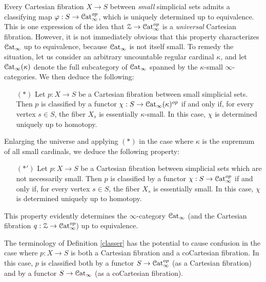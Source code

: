 \begin{remark}\label{uniright}
Every Cartesian fibration $X \rightarrow S$ between {\em small} simplicial sets admits a classifying map $\varphi: S \rightarrow \operatorname{\mathcal{C}at}_{\infty}^{op}$, which is uniquely determined up to equivalence. 
This is one expression of the idea that $\operatorname{\mathcal{Z}} \rightarrow \operatorname{\mathcal{C}at}_{\infty}^{op}$ is a {\it universal} Cartesian fibration. However, it is not immediately obvious that this property characterizes $\operatorname{\mathcal{C}at}_{\infty}$ up to equivalence, because $\operatorname{\mathcal{C}at}_{\infty}$ is not itself small. To remedy the situation, let us consider an arbitrary uncountable regular cardinal $\kappa$, and let $\operatorname{\mathcal{C}at}_{\infty}(\kappa)$ denote the full subcategory of $\operatorname{\mathcal{C}at}_{\infty}$ spanned by the $\kappa$-small $\infty$-categories. We then deduce the following:
\begin{itemize}
\item[$(\ast)$] Let $p: X \rightarrow S$ be a Cartesian fibration between small simplicial sets.
Then $p$ is classified by a functor $\chi: S \rightarrow \operatorname{\mathcal{C}at}_{\infty}(\kappa)^{op}$ if and only if,
for every vertex $s \in S$, the fiber $X_{s}$ is essentially $\kappa$-small. In this case, $\chi$ is determined uniquely up to homotopy.
\end{itemize}
Enlarging the universe and applying $(\ast)$ in the case where $\kappa$ is the supremum of all small cardinals, we deduce the following property:
\begin{itemize}
\item[$(\ast')$] Let $p: X \rightarrow S$ be a Cartesian fibration between simplicial sets which are not necessarily small. Then $p$ is classified by a functor $\chi: S \rightarrow \operatorname{\mathcal{C}at}_{\infty}^{op}$ if and only if, for every vertex $s \in S$, the fiber $X_{s}$ is essentially small. In this case, $\chi$ is determined uniquely up to homotopy.
\end{itemize}
This property evidently determines the $\infty$-category $\operatorname{\mathcal{C}at}_{\infty}$ (and the
Cartesian fibration $q: \operatorname{\mathcal{Z}} \rightarrow \operatorname{\mathcal{C}at}_{\infty}^{op}$) up to equivalence.
\end{remark}

\begin{warning}
The terminology of Definition \ref{classer} has the potential to cause confusion in the case where
$p: X \rightarrow S$ is both a Cartesian fibration and a coCartesian fibration. In this case,
$p$ is classified both by a functor $S \rightarrow \operatorname{\mathcal{C}at}_{\infty}^{op}$ (as a Cartesian fibration)
and by a functor $S \rightarrow \operatorname{\mathcal{C}at}_{\infty}$ (as a coCartesian fibration).
\end{warning}


